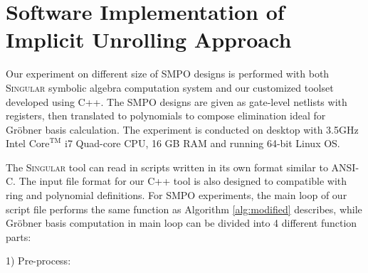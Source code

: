 \section{Software Implementation of Implicit Unrolling Approach}
Our experiment on different size of SMPO designs is performed with both \textsc{Singular} \cite{DGPS}
symbolic algebra computation system and our customized toolset developed using C++.
The SMPO designs are given as gate-level netlists with registers, then translated to polynomials to compose
elimination ideal for Gr\"obner basis calculation. The experiment is conducted on desktop with
3.5GHz Intel $\text{Core}^\text{TM}$ i7 Quad-core CPU, 16 GB RAM and running 64-bit Linux OS.

The \textsc{Singular} tool can read in scripts written in its own format similar to ANSI-C. 
The input file format for our C++ tool is also designed to compatible with  
ring and polynomial definitions. For SMPO experiments, the main 
loop of our script file performs the same function as Algorithm \ref{alg:modified} describes, while Gr\"obner basis
computation in main loop can be divided into 4 different function parts:

1) Pre-process:

